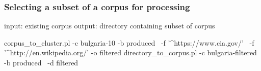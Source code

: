 \subsubsection{Selecting a subset of a corpus for processing}

\begin{boxedverbatim}
 input: existing corpus
 output: directory containing subset of corpus
 
 corpus_to_cluster.pl -c bulgaria-10 -b produced \
  -f '^https://www.cia.gov/' \
  -f '^http://en.wikipedia.org/' -o filtered 
 directory_to_corpus.pl -c bulgaria-filtered -b produced \
   -d filtered
\end{boxedverbatim}
